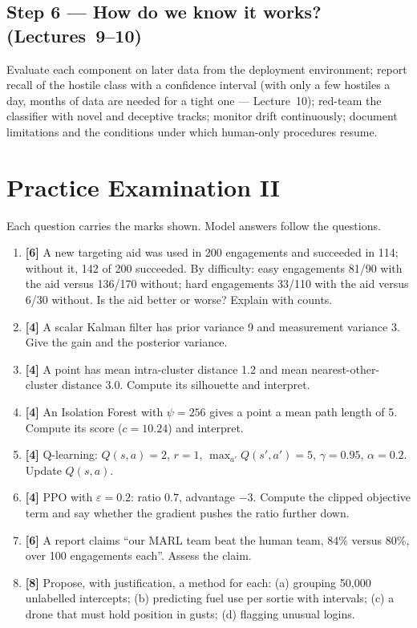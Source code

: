 \documentclass[11pt]{article}
\begin{document}
\subsection{Step 6 --- How do we know it works? (Lectures~9--10)}
Evaluate each component on later data from the deployment environment; report recall of the hostile class with a confidence interval (with only a few hostiles a day, months of data are needed for a tight one --- Lecture~10); red-team the classifier with novel and deceptive tracks; monitor drift continuously; document limitations and the conditions under which human-only procedures resume.

\section{Practice Examination II}
Each question carries the marks shown. Model answers follow the questions.
\begin{enumerate}
\item \textbf{[6]} A new targeting aid was used in 200 engagements and succeeded in 114; without it, 142 of 200 succeeded. By difficulty: easy engagements 81/90 with the aid versus 136/170 without; hard engagements 33/110 with the aid versus 6/30 without. Is the aid better or worse? Explain with counts.
\item \textbf{[4]} A scalar Kalman filter has prior variance 9 and measurement variance 3. Give the gain and the posterior variance.
\item \textbf{[4]} A point has mean intra-cluster distance 1.2 and mean nearest-other-cluster distance 3.0. Compute its silhouette and interpret.
\item \textbf{[4]} An Isolation Forest with $\psi=256$ gives a point a mean path length of 5. Compute its score ($c=10.24$) and interpret.
\item \textbf{[4]} Q-learning: $Q(s,a)=2$, $r=1$, $\max_{a'}Q(s',a')=5$, $\gamma=0.95$, $\alpha=0.2$. Update $Q(s,a)$.
\item \textbf{[4]} PPO with $\varepsilon=0.2$: ratio $0.7$, advantage $-3$. Compute the clipped objective term and say whether the gradient pushes the ratio further down.
\item \textbf{[6]} A report claims ``our MARL team beat the human team, 84\% versus 80\%, over 100 engagements each''. Assess the claim.
\item \textbf{[8]} Propose, with justification, a method for each: (a) grouping 50,000 unlabelled intercepts; (b) predicting fuel use per sortie with intervals; (c) a drone that must hold position in gusts; (d) flagging unusual logins.
\end{enumerate}
\end{document}

